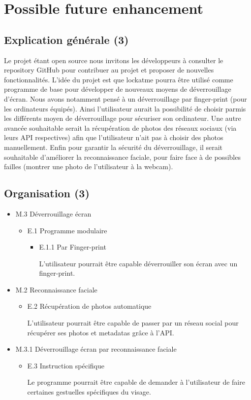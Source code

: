 \section{Possible future enhancement}
  \subsection{Explication générale (3)}
  Le projet étant open source nous invitons les développeurs à consulter le
  repository GitHub pour contribuer au projet et proposer de nouvelles
  fonctionnalités.
  L’idée du projet est que lockatme pourra être utilisé comme programme de
  base pour développer de nouveaux moyens de déverrouillage d’écran. Nous
  avons notamment pensé à un déverrouillage par finger-print (pour les
  ordinateurs équipés). Ainsi l’utilisateur aurait la possibilité de choisir
  parmis les différents moyen de déverrouillage pour sécuriser son ordinateur.
  Une autre avancée souhaitable serait la récupération de photos des réseaux
  sociaux (via leurs API respectives) afin que l’utilisateur n’ait pas à
  choisir des photos manuellement.
  Enfin pour garantir la sécurité du déverrouillage, il serait souhaitable
  d’améliorer la reconnaissance faciale, pour faire face à de possibles
  failles (montrer une photo de l’utilisateur à la webcam).
  \subsection{Organisation (3)}
  \begin{itemize}
  \item{M.3 Déverrouillage écran}
    \begin{itemize}
    \item{E.1 Programme modulaire}
      \begin{itemize}
      \item{E.1.1 Par Finger-print}

      L’utilisateur pourrait être capable déverrouiller son écran avec un
      finger-print.
      \\
      \end{itemize}
    \end{itemize}
    \item{M.2 Reconnaissance faciale}
    \begin{itemize}
    \item{E.2 Récupération de photos automatique}

    L’utilisateur pourrait être capable de passer par un réseau social
    pour récupérer ses photos et metadatas grâce à l'API.
    \\
    \end{itemize}
    \item{M.3.1 Déverrouillage écran par reconnaissance faciale}
    \begin{itemize}
      \item{E.3 Instruction spécifique}

      Le programme pourrait être capable de demander à l’utilisateur de faire
      certaines gestuelles spécifiques du visage.
    \end{itemize}
  \end{itemize}
